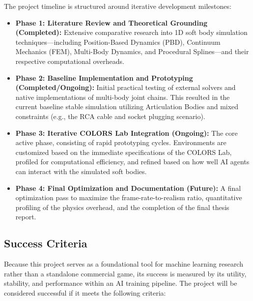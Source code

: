 \documentclass[a4paper,12pt]{report}
\begin{document}
The project timeline is structured around iterative development milestones:
\begin{itemize}
    \item \textbf{Phase 1: Literature Review and Theoretical Grounding (Completed):} Extensive comparative research into 1D soft body simulation techniques—including Position-Based Dynamics (PBD), Continuum Mechanics (FEM), Multi-Body Dynamics, and Procedural Splines—and their respective computational overheads.
    \item \textbf{Phase 2: Baseline Implementation and Prototyping (Completed/Ongoing):} Initial practical testing of external solvers and native implementations of multi-body joint chains. This resulted in the current baseline stable simulation utilizing Articulation Bodies and mixed constraints (e.g., the RCA cable and socket plugging scenario).
    \item \textbf{Phase 3: Iterative COLORS Lab Integration (Ongoing):} The core active phase, consisting of rapid prototyping cycles. Environments are customized based on the immediate specifications of the COLORS Lab, profiled for computational efficiency, and refined based on how well AI agents can interact with the simulated soft bodies.
    \item \textbf{Phase 4: Final Optimization and Documentation (Future):} A final optimization pass to maximize the frame-rate-to-realism ratio, quantitative profiling of the physics overhead, and the completion of the final thesis report.
\end{itemize}
\subsection{Success Criteria}
Because this project serves as a foundational tool for machine learning research rather than a standalone commercial game, its success is measured by its utility, stability, and performance within an AI training pipeline. The project will be considered successful if it meets the following criteria:
\end{document}
